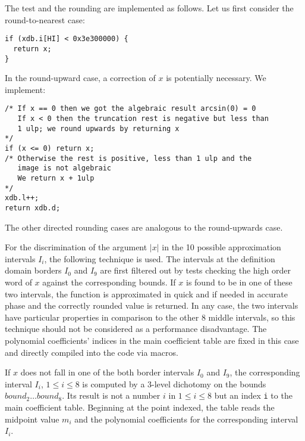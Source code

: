The test and the rounding are implemented as follows. Let us first
consider the round-to-nearest case:
\begin{lstlisting}[caption={Handling special cases - rounding (to nearest)},firstnumber=1]
if (xdb.i[HI] < 0x3e300000) {
  return x;
}
\end{lstlisting}
In the round-upward case, a correction of $x$ is potentially
necessary. We implement:
\begin{lstlisting}[caption={Handling special cases - rounding (upwards)},firstnumber=1]
/* If x == 0 then we got the algebraic result arcsin(0) = 0
   If x < 0 then the truncation rest is negative but less than
   1 ulp; we round upwards by returning x
*/
if (x <= 0) return x;
/* Otherwise the rest is positive, less than 1 ulp and the
   image is not algebraic
   We return x + 1ulp
*/
xdb.l++;
return xdb.d;
\end{lstlisting}
The other directed rounding cases are analogous to the round-upwards
case.

For the discrimination of the argument $\left \vert x \right \vert$ in
the 10 possible approximation intervals $I_i$, the following technique
is used. The intervals at the definition domain borders $I_0$ and
$I_9$ are first filtered out by tests checking the high order word of
$x$ against the corresponding bounds. If $x$ is found to be in one of
these two intervals, the function is approximated in quick and if
needed in accurate phase and the correctly rounded value is
returned. In any case, the two intervals have particular properties in
comparison to the other 8 middle intervals, so this technique should
not be considered as a performance disadvantage. The polynomial
coefficients' indices in the main coefficient table are fixed in this
case and directly compiled into the code via macros.

If $x$ does not fall in one of the both border intervals $I_0$ and
$I_9$, the corresponding interval $I_i$, $1 \leq i \leq 8$ is computed
by a 3-level dichotomy on the bounds $bound_2 \dots bound_8$.  Its
result is not a number $i$ in $1 \leq i \leq 8$ but an index {\tt i}
to the main coefficient table. Beginning at the point indexed, the
table reads the midpoint value $m_i$ and the polynomial coefficients
for the corresponding interval $I_i$.

